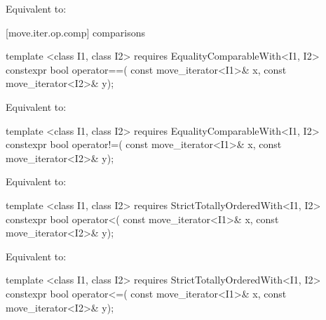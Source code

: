 \begin{itemdescr}
\pnum
\effects Equivalent to:
\end{itemdescr}

[move.iter.op.comp]{ comparisons}

%
%
\begin{itemdecl}
template <class I1, class I2>
    requires EqualityComparableWith<I1, I2>
  constexpr bool operator==(
    const move_iterator<I1>& x, const move_iterator<I2>& y);
\end{itemdecl}

\begin{itemdescr}
\pnum
\effects Equivalent to:
\end{itemdescr}

%
%
\begin{itemdecl}
template <class I1, class I2>
    requires EqualityComparableWith<I1, I2>
  constexpr bool operator!=(
    const move_iterator<I1>& x, const move_iterator<I2>& y);
\end{itemdecl}

\begin{itemdescr}
\pnum
\effects Equivalent to:
\end{itemdescr}

%
%
\begin{itemdecl}
template <class I1, class I2>
    requires StrictTotallyOrderedWith<I1, I2>
  constexpr bool operator<(
    const move_iterator<I1>& x, const move_iterator<I2>& y);
\end{itemdecl}

\begin{itemdescr}
\pnum
\effects Equivalent to:
\end{itemdescr}

%
%
\begin{itemdecl}
template <class I1, class I2>
    requires StrictTotallyOrderedWith<I1, I2>
  constexpr bool operator<=(
    const move_iterator<I1>& x, const move_iterator<I2>& y);
\end{itemdecl}


